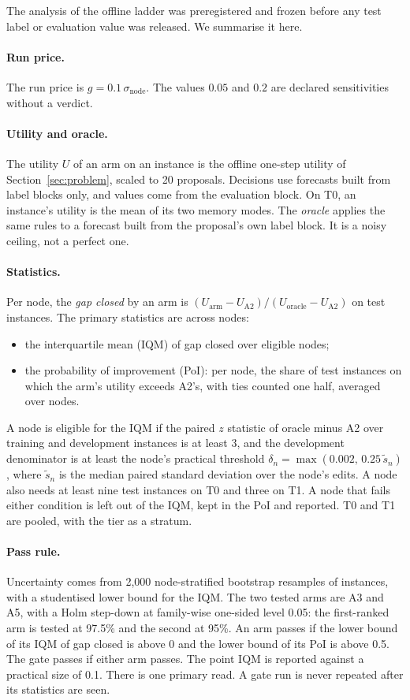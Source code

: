 The analysis of the offline ladder was preregistered and frozen before any test label or evaluation value was released. We summarise it here.

\paragraph{Run price.}
The run price is $g=0.1\,\sigma_{\mathrm{node}}$. The values $0.05$ and $0.2$ are declared sensitivities without a verdict.

\paragraph{Utility and oracle.}
The utility $U$ of an arm on an instance is the offline one-step utility of Section~\ref{sec:problem}, scaled to 20 proposals. Decisions use forecasts built from label blocks only, and values come from the evaluation block. On T0, an instance's utility is the mean of its two memory modes. The \emph{oracle} applies the same rules to a forecast built from the proposal's own label block. It is a noisy ceiling, not a perfect one.

\paragraph{Statistics.}
Per node, the \emph{gap closed} by an arm is $(U_{\mathrm{arm}}-U_{\mathrm{A2}})/(U_{\mathrm{oracle}}-U_{\mathrm{A2}})$ on test instances. The primary statistics are across nodes:
\begin{itemize}
\item the interquartile mean (IQM) of gap closed over eligible nodes;
\item the probability of improvement (PoI): per node, the share of test instances on which the arm's utility exceeds A2's, with ties counted one half, averaged over nodes.
\end{itemize}
A node is eligible for the IQM if the paired $z$ statistic of oracle minus A2 over training and development instances is at least 3, and the development denominator is at least the node's practical threshold $\delta_n=\max(0.002,\,0.25\,\tilde s_n)$, where $\tilde s_n$ is the median paired standard deviation over the node's edits. A node also needs at least nine test instances on T0 and three on T1. A node that fails either condition is left out of the IQM, kept in the PoI and reported. T0 and T1 are pooled, with the tier as a stratum.

\paragraph{Pass rule.}
Uncertainty comes from 2{,}000 node-stratified bootstrap resamples of instances, with a studentised lower bound for the IQM. The two tested arms are A3 and A5, with a Holm step-down at family-wise one-sided level 0.05: the first-ranked arm is tested at 97.5\% and the second at 95\%. An arm passes if the lower bound of its IQM of gap closed is above 0 and the lower bound of its PoI is above 0.5. The gate passes if either arm passes. The point IQM is reported against a practical size of 0.1. There is one primary read. A gate run is never repeated after its statistics are seen.

